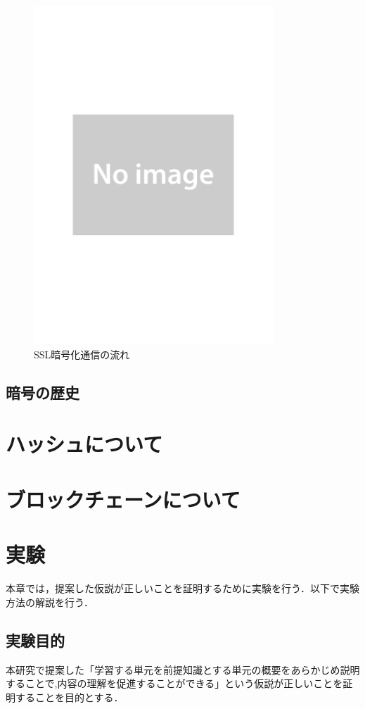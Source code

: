 \documentclass[a4j,12pt]{jsarticle}
\begin{document}
\begin{figure}[H]
\centering
\includegraphics[width=9cm]{noimage.pdf}
\caption{SSL暗号化通信の流れ}
\label{fig:no}
\end{figure} 



\subsection{暗号の歴史}







\section{ハッシュについて}

\section{ブロックチェーンについて}

\section{実験}
本章では，提案した仮説が正しいことを証明するために実験を行う．以下で実験方法の解説を行う．
\subsection{実験目的}
本研究で提案した「学習する単元を前提知識とする単元の概要をあらかじめ説明することで,内容の理解を促進することができる」という仮説が正しいことを証明することを目的とする．
\end{document}

